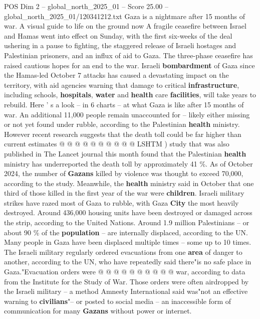 \begin{textsample}{POS Dim 2 – global\_north\_2025\_01 – Score 25.00 – global\_north\_2025\_01/120341212.txt}  \label{ex:f2_pos_368}
Gaza is a nightmare after 15 months of war.
A visual guide to life on the ground now A fragile ceasefire between Israel and Hamas went into effect on Sunday, with the first six-weeks of the deal ushering in a pause to fighting, the staggered release of Israeli hostages and Palestinian prisoners, and an influx of aid to Gaza.
The three-phase ceasefire has raised cautious hopes for an end to the war.
Israeli \textbf{bombardment} of Gaza since the Hamas-led October 7 attacks has caused a devastating impact on the territory, with aid agencies warning that damage to critical \textbf{infrastructure}, including schools, \textbf{hospitals}, \textbf{water} and \textbf{health} care \textbf{facilities}, will take years to rebuild.
Here ' s a look -- in 6 charts -- at what Gaza is like after 15 months of war.
An additional 11,000 people remain unaccounted for -- likely either missing or not yet found under rubble, according to the Palestinian \textbf{health} ministry.
However recent research suggests that the death toll could be far higher than current estimates @ @ @ @ @ @ @ @ @ @ LSHTM ) study that was also published in The Lancet journal this month found that the Palestinian \textbf{health} ministry has underreported the death toll by approximately 41 \%.
As of October 2024, the number of \textbf{Gazans} killed by violence was thought to exceed 70,000, according to the study.
Meanwhile, the \textbf{health} ministry said in October that one third of those killed in the first year of the war were \textbf{children}.
Israeli military strikes have razed most of Gaza to rubble, with Gaza \textbf{City} the most heavily destroyed.
Around 436,000 housing units have been destroyed or damaged across the strip, according to the United Nations.
Around 1.9 million Palestinians -- or about 90 \% of the \textbf{population} -- are internally displaced, according to the UN.
Many people in Gaza have been displaced multiple times -- some up to 10 times.
The Israeli military regularly ordered evacuations from one \textbf{area} of danger to another, according to the UN, who have repeatedly said there"is no safe place in Gaza."Evacuation orders were @ @ @ @ @ @ @ @ @ @ war, according to data from the Institute for the Study of War.
Those orders were often airdropped by the Israeli military -- a method Amnesty International said was"not an effective warning to \textbf{civilians}"-- or posted to social media -- an inaccessible form of communication for many \textbf{Gazans} without power or internet.

\end{textsample}

